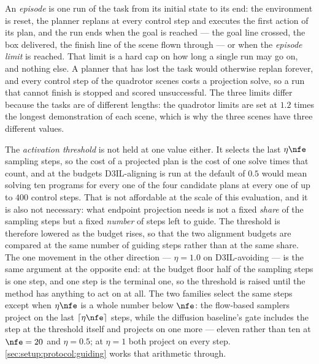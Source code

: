 An \emph{episode} is one run of the task from its initial state to its end: the environment is reset, the
planner replans at every control step and executes the first action of its plan, and the run ends when the
goal is reached --- the goal line crossed, the box delivered, the finish line of the scene flown through
--- or when the \emph{episode limit} is reached. That limit is a hard cap on how long a single run may
go on, and nothing else. A planner that has lost the task would otherwise replan forever, and every control step of the
quadrotor scenes costs a projection solve, so a run that cannot finish is stopped and scored unsuccessful.
The three limits differ because the tasks are of different lengths: the quadrotor limits are set at $1.2$
times the longest demonstration of each scene, which is why the three scenes have three different values.

The \emph{activation threshold} is not held at one value either. It selects the last $\eta\nfe$ sampling
steps, so the cost of a projected plan is the cost of one solve times that count, and at the budgets
D3IL-aligning is run at the default of $0.5$ would mean solving ten programs for every one of the four
candidate plans at every one of up to $400$ control steps. That is not affordable at the scale of this
evaluation, and it is also not necessary: what endpoint projection needs is not a fixed \emph{share} of
the sampling steps but a fixed \emph{number} of steps left to guide. The threshold is therefore lowered as
the budget rises, so that the two alignment budgets are compared at the same number of guiding steps
rather than at the same share. The one movement in the other direction --- $\eta=1.0$ on D3IL-avoiding ---
is the same argument at the opposite end: at the budget floor half of the sampling steps is one step, and
one step is the terminal one, so the threshold is raised until the method has anything to act on at all.
The two families select the same steps except when $\eta\nfe$ is a whole number below $\nfe$: the
flow-based samplers project on the last $\lceil\eta\nfe\rceil$ steps, while the diffusion baseline's gate
includes the step at the threshold itself and projects on one more --- eleven rather than ten at $\nfe=20$
and $\eta=0.5$; at $\eta=1$ both project on every step.
\autoref{sec:setup:protocol:guiding} works that arithmetic through.

